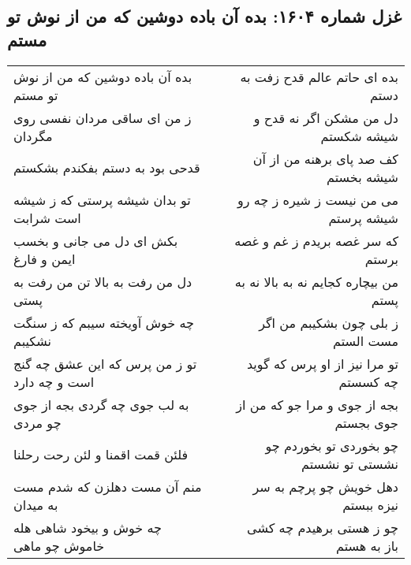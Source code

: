 \begin{center}
\section*{غزل شماره ۱۶۰۴: بده آن باده دوشین که من از نوش تو مستم}
\label{sec:1604}
\begin{longtable}{l p{0.5cm} r}
بده آن باده دوشین که من از نوش تو مستم
&&
بده ای حاتم عالم قدح زفت به دستم
\\
ز من ای ساقی مردان نفسی روی مگردان
&&
دل من مشکن اگر نه قدح و شیشه شکستم
\\
قدحی بود به دستم بفکندم بشکستم
&&
کف صد پای برهنه من از آن شیشه بخستم
\\
تو بدان شیشه پرستی که ز شیشه است شرابت
&&
می من نیست ز شیره ز چه رو شیشه پرستم
\\
بکش ای دل می جانی و بخسب ایمن و فارغ
&&
که سر غصه بریدم ز غم و غصه برستم
\\
دل من رفت به بالا تن من رفت به پستی
&&
من بیچاره کجایم نه به بالا نه به پستم
\\
چه خوش آویخته سیبم که ز سنگت نشکیبم
&&
ز بلی چون بشکیبم من اگر مست الستم
\\
تو ز من پرس که این عشق چه گنج است و چه دارد
&&
تو مرا نیز از او پرس که گوید چه کسستم
\\
به لب جوی چه گردی بجه از جوی چو مردی
&&
بجه از جوی و مرا جو که من از جوی بجستم
\\
فلئن قمت اقمنا و لئن رحت رحلنا
&&
چو بخوردی تو بخوردم چو نشستی تو نشستم
\\
منم آن مست دهلزن که شدم مست به میدان
&&
دهل خویش چو پرچم به سر نیزه ببستم
\\
چه خوش و بیخود شاهی هله خاموش چو ماهی
&&
چو ز هستی برهیدم چه کشی باز به هستم
\\
\end{longtable}
\end{center}
